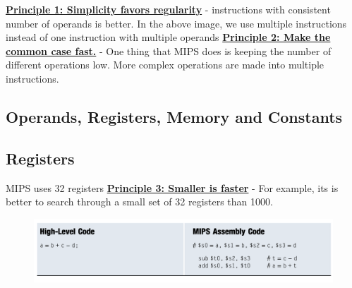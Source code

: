 \documentclass[12pt]{report}
\begin{document}
\underline{\textbf{Principle 1: Simplicity favors regularity}}
- instructions with consistent number of operands is better. In the above image, we use multiple instructions instead of one instruction with multiple operands
\bigbreak
\underline{\textbf{Principle 2: Make the common case fast.}}
- One thing that MIPS does is keeping the number of different operations low. More complex operations are made into multiple instructions. 

\subsection{Operands, Registers, Memory and Constants}

\subsection{Registers}

\smallbreak
MIPS uses 32 registers
\bigbreak
\underline{\textbf{Principle 3: Smaller is faster}}
- For example, its is better to search through a small set of 32 registers than 1000.

\begin{figure}[H]
  \centering
  \includegraphics[width=.9\textwidth]{instructions-with-registers.png}
\end{figure}
\end{document}
